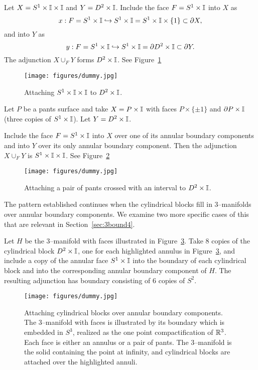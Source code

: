 \begin{ex}
	\label{ex:AxIuDxI}
	Let $X=S^1\times\mathbb{I}\times\mathbb{I}$ and $Y=D^2\times\mathbb{I}$.
	Include the face $F=S^1\times\mathbb{I}$ into $X$ as
	\[
		x:F= S^1\times\mathbb{I} \hookrightarrow S^1\times\mathbb{I}=S^1 \times\mathbb{I}\times\{1\}\subset \partial X,
	\]
	and into $Y$ as
	\[
		y:F= S^1\times\mathbb{I}\hookrightarrow S^1\times\mathbb{I}=\partial D^2 \times\mathbb{I}\subset \partial Y.
	\]
	The adjunction $X\cup_F Y$ forms $D^2\times\mathbb{I}$.
	See Figure~\ref{fig:AxIuDxI}
\end{ex}

\begin{figure}[H]
	\centering
	\caption{Attaching $S^1\times\mathbb{I}\times\mathbb{I}$ to $D^2\times\mathbb{I}$.}
	\texttt{[image: figures/dummy.jpg]}
	\label{fig:AxIuDxI}
\end{figure}

\begin{ex}
	\label{ex:PxIuDxI}
	Let $P$ be a pants surface and take $X=P\times\mathbb{I}$ with faces $P\times\{\pm 1\}$ and $\partial P\times\mathbb{I}$ (three copies of $S^1\times \mathbb{I}$).
	Let $Y=D^2\times\mathbb{I}$.
	
	Include the face $F=S^1\times\mathbb{I}$ into $X$ over one of its annular boundary components and into $Y$ over its only annular boundary component.
	Then the adjunction $X\cup_F Y$ is $ S^1\times\mathbb{I}\times\mathbb{I} $.
	See Figure~\ref{fig:PxIuDxI}
\end{ex}

\begin{figure}[H]
	\centering
	\caption{Attaching a pair of pants crossed with an interval to $D^2\times\mathbb{I}$.}
	\texttt{[image: figures/dummy.jpg]}
	\label{fig:PxIuDxI}
\end{figure}

The pattern established continues when the cylindrical blocks fill in 3--manifolds over annular boundary components.
We examine two more specific cases of this that are relevant in Section~\ref{sec:3bound4}.

\begin{ex}
	\label{ex:interactivefiber1uDxI}
	Let $H$ be the 3--manifold with faces illustrated in Figure~\ref{fig:interactivefiber1uDxI}.
	Take 8 copies of the cylindrical block $D^2\times\mathbb{I}$, one for each highlighted annulus in Figure~\ref{fig:interactivefiber1uDxI}, and include a copy of the annular face $S^1\times\mathbb{I}$ into the boundary of each cylindrical block and into the corresponding annular boundary component of $H$.
	The resulting adjunction has boundary consisting of 6 copies of $S^2$.
\end{ex}

\begin{figure}[H]
	\centering
	\caption{Attaching cylindrical blocks over annular boundary components.
	The 3--manifold with faces is illustrated by its boundary which is embedded in $S^3$, realized as the one point compactification of $ \mathbb{R}^3 $.
	Each face is either an annulus or a pair of pants.
	The 3--manifold is the solid containing the point at infinity, and cylindrical blocks are attached over the highlighted annuli.}
	\texttt{[image: figures/dummy.jpg]}
	\label{fig:interactivefiber1uDxI}
\end{figure}

